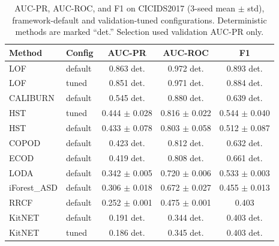 \begin{table}[t]
\centering
\small
\begin{tabular}{llccc}
\toprule
Method & Config & AUC-PR & AUC-ROC & F1 \\
\midrule
LOF & default & 0.863 det. & 0.972 det. & 0.893 det. \\
LOF & tuned & 0.851 det. & 0.971 det. & 0.884 det. \\
CALIBURN & default & 0.545 det. & 0.880 det. & 0.639 det. \\
HST & tuned & 0.444 $\pm$ 0.028 & 0.816 $\pm$ 0.022 & 0.544 $\pm$ 0.040 \\
HST & default & 0.433 $\pm$ 0.078 & 0.803 $\pm$ 0.058 & 0.512 $\pm$ 0.087 \\
COPOD & default & 0.423 det. & 0.812 det. & 0.632 det. \\
ECOD & default & 0.419 det. & 0.808 det. & 0.661 det. \\
LODA & default & 0.342 $\pm$ 0.005 & 0.720 $\pm$ 0.006 & 0.533 $\pm$ 0.003 \\
iForest\_ASD & default & 0.306 $\pm$ 0.018 & 0.672 $\pm$ 0.027 & 0.455 $\pm$ 0.013 \\
RRCF & default & 0.252 $\pm$ 0.001 & 0.475 $\pm$ 0.001 & 0.403 \\
KitNET & default & 0.191 det. & 0.344 det. & 0.403 det. \\
KitNET & tuned & 0.186 det. & 0.345 det. & 0.403 det. \\
\bottomrule
\end{tabular}
\caption{AUC-PR, AUC-ROC, and F1 on CICIDS2017 (3-seed mean $\pm$ std), framework-default and validation-tuned configurations. Deterministic methods are marked ``det.'' Selection used validation AUC-PR only.}
\label{tab:cicids-tuned}
\end{table}
